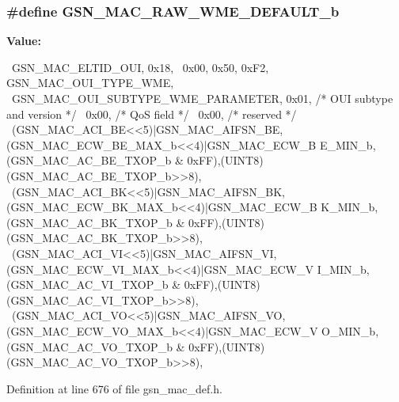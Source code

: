 \hypertarget{a00522_aaf41ff6e32cc859056ba8f9b0b2e0d0c}{
\subsubsection[{GSN\_\-MAC\_\-RAW\_\-WME\_\-DEFAULT\_\-b}]{\setlength{\rightskip}{0pt plus 5cm}\#define GSN\_\-MAC\_\-RAW\_\-WME\_\-DEFAULT\_\-b}}
\label{a00522_aaf41ff6e32cc859056ba8f9b0b2e0d0c}
{\bfseries Value:}
\begin{DoxyCode}
{{                                                                               
              \
    GSN_MAC_ELTID_OUI, 0x18,                                                     
                  \
    0x00, 0x50, 0xF2, GSN_MAC_OUI_TYPE_WME,                                      
                  \
    GSN_MAC_OUI_SUBTYPE_WME_PARAMETER, 0x01,        /* OUI subtype and version   
               */ \
    0x00,                                       /* QoS field                     
           */ \
    0x00,                                       /* reserved                      
           */ \
    (GSN_MAC_ACI_BE<<5)|GSN_MAC_AIFSN_BE, (GSN_MAC_ECW_BE_MAX_b<<4)|GSN_MAC_ECW_B
      E_MIN_b, (GSN_MAC_AC_BE_TXOP_b & 0xFF),(UINT8)(GSN_MAC_AC_BE_TXOP_b>>8), \
    (GSN_MAC_ACI_BK<<5)|GSN_MAC_AIFSN_BK, (GSN_MAC_ECW_BK_MAX_b<<4)|GSN_MAC_ECW_B
      K_MIN_b, (GSN_MAC_AC_BK_TXOP_b & 0xFF),(UINT8)(GSN_MAC_AC_BK_TXOP_b>>8), \
    (GSN_MAC_ACI_VI<<5)|GSN_MAC_AIFSN_VI, (GSN_MAC_ECW_VI_MAX_b<<4)|GSN_MAC_ECW_V
      I_MIN_b, (GSN_MAC_AC_VI_TXOP_b & 0xFF),(UINT8)(GSN_MAC_AC_VI_TXOP_b>>8), \
    (GSN_MAC_ACI_VO<<5)|GSN_MAC_AIFSN_VO, (GSN_MAC_ECW_VO_MAX_b<<4)|GSN_MAC_ECW_V
      O_MIN_b, (GSN_MAC_AC_VO_TXOP_b & 0xFF),(UINT8)(GSN_MAC_AC_VO_TXOP_b>>8), \
}}
\end{DoxyCode}


Definition at line 676 of file gsn\_\-mac\_\-def.h.

